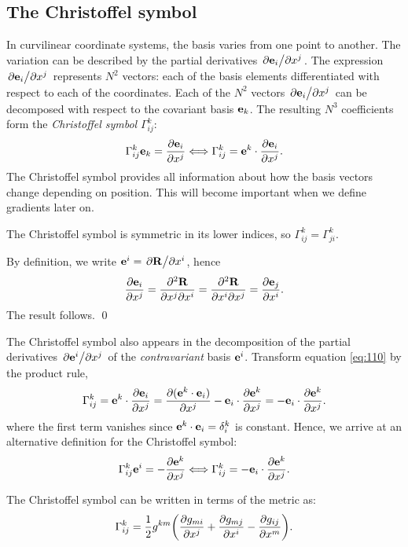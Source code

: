 \documentclass{article}
\begin{document}
	\subsection{The Christoffel symbol}
	In curvilinear coordinate systems, the basis varies from one point to another. The variation can be described by the partial derivatives $ \pdv*{\vb{e}_{i}}{x^{j}} $. The expression $ \pdv*{\vb{e}_{i}}{x^{j}} $ represents $ N^2 $ vectors: each of the basis elements differentiated with respect to each of the coordinates. Each of the $ N^2 $ vectors $ \pdv*{\vb{e}_{i}}{x^{j}} $ can be decomposed with respect to the covariant basis $ \vb{e}_{k} $. The resulting $ N^3 $ coefficients form the \textit{Christoffel symbol} $ \Gamma^k_{ij} $:
	\begin{equation} \label{eq:110}
		\Gamma^{k}_{ij} \vb{e}_{k} = \pdv{\vb{e}_{i}}{x^{j}} \Longleftrightarrow \Gamma^{k}_{ij} = \vb{e}^{k} \cdot \pdv{\vb{e}_{i}}{x^{j}}.
	\end{equation} 
	The Christoffel symbol provides all information about how the basis vectors change depending on position. This will become important when we define gradients later on.
	\begin{proposition}
		The Christoffel symbol is symmetric in its lower indices, so $ \Gamma^{k}_{ij} = \Gamma^{k}_{ji} $.
	\end{proposition}
	\proof By definition, we write $ \vb{e}^{i} = \pdv*{\vb{R}}{x^{i}} $, hence
	\[
	\pdv{\vb{e}_{i}}{x^{j}} = \pdv{^2\vb{R}}{x^{j}\partial x^{i}} =  \pdv{^2\vb{R}}{x^{i}\partial x^{j}} = \pdv{\vb{e}_{j}}{x^{i}}.
	\]
	The result follows. \qed
	\par
	The Christoffel symbol also appears in the decomposition of the partial
	derivatives $ \pdv*{\vb{e}^{i}}{x^{j}} $ of the \textit{contravariant} basis $ \vb{e}^{i} $. Transform equation \eqref{eq:110} by the product rule,
	\[
	\Gamma^{k}_{ij} = \vb{e}^{k} \cdot \pdv{\vb{e}_{i}}{x^{j}} = \pdv{ ( \vb{e}^{k}\cdot \vb{e}_{i} ) }{x^{j}} - \vb{e}_{i} \cdot \pdv{\vb{e}^{k}}{x^{j}} = - \vb{e}_{i} \cdot \pdv{\vb{e}^{k}}{x^{j}}.
	\]
	where the first term vanishes since $ \vb{e}^{k} \cdot \vb{e}_{i} = \delta ^{k} _{i} $ is constant. Hence, we arrive at an alternative definition for the Christoffel symbol:
	\begin{equation}
			\Gamma^{k}_{ij} \vb{e}^{i} = - \pdv{\vb{e}^{k}}{x^{j}} \Longleftrightarrow \Gamma^{k}_{ij} = - \vb{e}_{i} \cdot \pdv{\vb{e}^{k}}{x^{j}}.
	\end{equation}
	\begin{proposition}
		The Christoffel symbol can be written in terms of the metric as:
		\[
			\Gamma^{k}_{ij} = \frac{1}{2} g^{km} \qty(\pdv{g_{mi}}{x^{j}} + \pdv{g_{mj}}{x^{i}} - \pdv{g_{ij}}{x^{m}}).
		\]
	\end{proposition}
\end{document}

